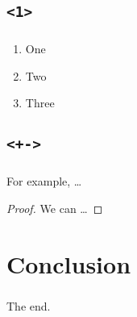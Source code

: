 \documentclass{beamer}
\begin{document}
\subsection{\texttt{<1>}}
\begin{frame}
  \frametitle{\insertsubsectionhead}
  \begin{enumerate}
  \item<1> One
  \item<2> Two
  \item<3> Three
  \end{enumerate}
\end{frame}

\subsection{\texttt{<+->}}
\begin{frame}[<+->]
  \frametitle{\insertsubsectionhead}
  \begin{example}
    For example, \dots
  \end{example}
  \begin{proof}
    We can \dots
  \end{proof}

\end{frame}

\section{Conclusion}

\begin{frame}
  \frametitle{\insertsectionhead}
  The end.
\end{frame}
\end{document}
